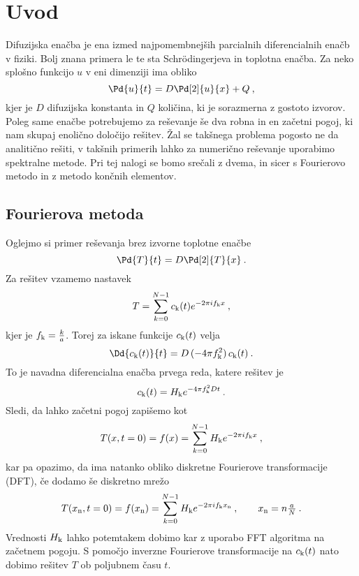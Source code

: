 \documentclass{porocilo}
\begin{document}
\maketitle

\section{Uvod}
Difuzijska enačba je ena izmed najpomembnejših parcialnih diferencialnih enačb v fiziki. Bolj znana primera le te sta Schr{\"o}dingerjeva in toplotna enačba. Za neko splošno funkcijo $u$ v eni dimenziji ima obliko
\begin{equation*}
    \Pd{u}{t} = D \Pd[2]{u}{x} + Q \>,
\end{equation*}
kjer je $D$ difuzijska konstanta in $Q$ količina, ki je sorazmerna z gostoto izvorov. Poleg same enačbe potrebujemo za reševanje še dva robna in en začetni pogoj, ki nam skupaj enolično določijo rešitev. Žal se takšnega problema pogosto ne da analitično rešiti, v takšnih primerih lahko za numerično reševanje uporabimo spektralne metode. Pri tej nalogi se bomo srečali z dvema, in sicer s Fourierovo metodo in z metodo končnih elementov.

\subsection{Fourierova metoda}
Oglejmo si primer reševanja brez izvorne toplotne enačbe
\begin{equation}
    \label{eq:pde}
    \Pd{T}{t} = D \Pd[2]{T}{x} \>.
\end{equation}
Za rešitev vzamemo nastavek
\begin{equation*}
    T = \sum_{k=0}^{N-1} c_{\rm k}(t) e^{-2\pi i f_{\rm k} x} \>,
\end{equation*}
kjer je $f_{\rm k} = \frac{k}{a}$. Torej za iskane funkcije $c_{\rm k}(t)$ velja
\begin{equation*}
    \Dd{c_{\rm k}(t)}{t} = D\, (-4\pi f_{\rm k}^2) \, c_{\rm k}(t) \>.
\end{equation*}
To je navadna diferencialna enačba prvega reda, katere rešitev je
\begin{equation*}
    c_{\rm k}(t) = H_{\rm k} e^{-4\pi f_{\rm k}^2 D t} \>.
\end{equation*}
Sledi, da lahko začetni pogoj zapišemo kot
\begin{equation*}
    T(x, t=0) = f(x) = \sum_{k=0}^{N-1}H_{\rm k} e^{-2\pi i f_{\rm k} x} \>,
\end{equation*}
kar pa opazimo, da ima natanko obliko diskretne Fourierove transformacije (DFT), če dodamo še diskretno mrežo
\begin{equation*}
    T(x_{\rm n}, t=0) = f(x_{\rm n}) = \sum_{k=0}^{N-1}H_{\rm k} e^{-2\pi i f_{\rm k} x_{\rm n}} \>, \qquad x_{\rm n} = n \tfrac{a}{N} \>.
\end{equation*}
Vrednosti $H_{\rm k}$ lahko potemtakem dobimo kar z uporabo FFT algoritma na začetnem pogoju. S pomočjo inverzne Fourierove transformacije na $c_{\rm k}(t)$ nato dobimo rešitev $T$ ob poljubnem času $t$.
\end{document}
